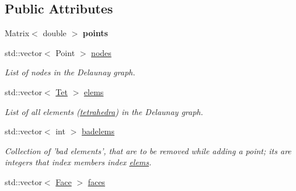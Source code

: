 \subsection*{Public Attributes}
\begin{DoxyCompactItemize}
\item 
\hypertarget{classDelaunay3d_a938f34fc5d7b0ef177092389226b3620}{Matrix$<$ double $>$ {\bfseries points}}\label{classDelaunay3d_a938f34fc5d7b0ef177092389226b3620}

\item 
\hypertarget{classDelaunay3d_a4f767d7975fdd85a5a326999eb04f557}{std\-::vector$<$ Point $>$ \hyperlink{classDelaunay3d_a4f767d7975fdd85a5a326999eb04f557}{nodes}}\label{classDelaunay3d_a4f767d7975fdd85a5a326999eb04f557}

\begin{DoxyCompactList}\small\item\em List of nodes in the Delaunay graph. \end{DoxyCompactList}\item 
\hypertarget{classDelaunay3d_ab97f146049daef3d7a79939fa6bdc629}{std\-::vector$<$ \hyperlink{classTet}{Tet} $>$ \hyperlink{classDelaunay3d_ab97f146049daef3d7a79939fa6bdc629}{elems}}\label{classDelaunay3d_ab97f146049daef3d7a79939fa6bdc629}

\begin{DoxyCompactList}\small\item\em List of all elements (\hyperlink{classTet}{tetrahedra}) in the Delaunay graph. \end{DoxyCompactList}\item 
\hypertarget{classDelaunay3d_a49a8bff2fcbe3adfbdaacbafc8abf34a}{std\-::vector$<$ int $>$ \hyperlink{classDelaunay3d_a49a8bff2fcbe3adfbdaacbafc8abf34a}{badelems}}\label{classDelaunay3d_a49a8bff2fcbe3adfbdaacbafc8abf34a}

\begin{DoxyCompactList}\small\item\em Collection of 'bad elements', that are to be removed while adding a point; its are integers that index members index \hyperlink{classDelaunay3d_ab97f146049daef3d7a79939fa6bdc629}{elems}. \end{DoxyCompactList}\item 
\hypertarget{classDelaunay3d_a52099509435e33e359a20e6da2ff9bfa}{std\-::vector$<$ \hyperlink{structFace}{Face} $>$ \hyperlink{classDelaunay3d_a52099509435e33e359a20e6da2ff9bfa}{faces}}\label{classDelaunay3d_a52099509435e33e359a20e6da2ff9bfa}


\end{DoxyCompactItemize}

